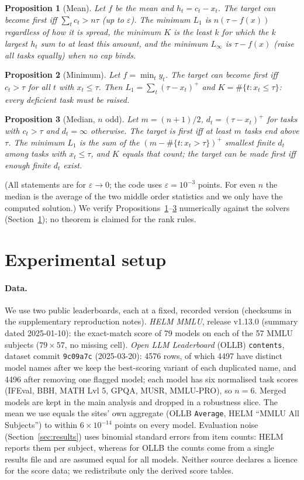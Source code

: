 \documentclass{article}
\newtheorem{proposition}{Proposition}
\begin{document}
\begin{proposition}[Mean]\label{prop:mean}
Let $f$ be the mean and $h_t=c_t-x_t$. The target can become first iff $\sum_t c_t> n\tau$ (up to $\varepsilon$). The minimum $L_1$ is $n(\tau-f(x))$ regardless of how it is spread, the minimum $K$ is the least $k$ for which the $k$ largest $h_t$ sum to at least this amount, and the minimum $L_\infty$ is $\tau-f(x)$ (raise all tasks equally) when no cap binds.
\end{proposition}
\begin{proposition}[Minimum]\label{prop:min}
Let $f=\min_t y_t$. The target can become first iff $c_t>\tau$ for all $t$ with $x_t\le\tau$. Then $L_1=\sum_t(\tau-x_t)^+$ and $K=\#\{t:x_t\le\tau\}$: every deficient task must be raised.
\end{proposition}
\begin{proposition}[Median, $n$ odd]\label{prop:median}
Let $m=(n+1)/2$, $d_t=(\tau-x_t)^+$ for tasks with $c_t>\tau$ and $d_t=\infty$ otherwise. The target is first iff at least $m$ tasks end above $\tau$. The minimum $L_1$ is the sum of the $(m-\#\{t:x_t>\tau\})^+$ smallest finite $d_t$ among tasks with $x_t\le\tau$, and $K$ equals that count; the target can be made first iff enough finite $d_t$ exist.
\end{proposition}
(All statements are for $\varepsilon\to0$; the code uses $\varepsilon=10^{-3}$ points. For even $n$ the median is the average of the two middle order statistics and we only have the computed solution.) We verify Propositions~\ref{prop:mean}--\ref{prop:median} numerically against the solvers (Section~\ref{sec:exp}); no theorem is claimed for the rank rules.

\section{Experimental setup}
\label{sec:exp}
\paragraph{Data.}
We use two public leaderboards, each at a fixed, recorded version (checksums in the supplementary reproduction notes). \emph{HELM MMLU}, release v1.13.0 (summary dated 2025-01-10): the exact-match score of 79 models on each of the 57 MMLU subjects ($79\times57$, no missing cell). \emph{Open LLM Leaderboard} (OLLB) \texttt{contents}, dataset commit \texttt{9c09a7c} (2025-03-20): 4576 rows, of which 4497 have distinct model names after we keep the best-scoring variant of each duplicated name, and 4496 after removing one flagged model; each model has six normalised task scores (IFEval, BBH, MATH Lvl 5, GPQA, MUSR, MMLU-PRO), so $n=6$. Merged models are kept in the main analysis and dropped in a robustness slice. The mean we use equals the sites' own aggregate (OLLB \texttt{Average}, HELM ``MMLU All Subjects'') to within $6\times10^{-14}$ points on every model. Evaluation noise (Section~\ref{sec:results}) uses binomial standard errors from item counts: HELM reports them per subject, whereas for OLLB the counts come from a single results file and are assumed equal for all models. Neither source declares a licence for the score data; we redistribute only the derived score tables.
\end{document}
